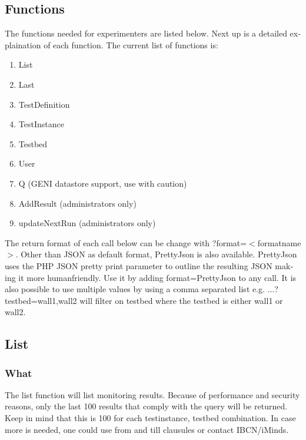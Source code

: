 \begin{otherlanguage}{english}
\section{Functions}
The functions needed for experimenters are listed below. Next up is a detailed explaination of each function. The current list of functions is:
\begin{enumerate}
\item List
\item Last
\item TestDefinition
\item TestInstance
\item Testbed
\item User
\item Q (GENI datastore support, use with caution)
\item AddResult (administrators only)
\item updateNextRun (administrators only)
\end{enumerate}
\npar
The return format of each call below can be change with ?format=$<$formatname$>$. 
Other than JSON as default format, PrettyJson is also available. PrettyJson uses the PHP JSON pretty print parameter to outline the resulting JSON making it more humanfriendly.
Use it by adding format=PrettyJson to any call.
\npar
It is also possible to use multiple values by using a comma separated list e.g. ...?testbed=wall1,wall2 will filter on testbed where the testbed is either wall1 or wall2.
\subsection{List}
\subsubsection{What}
The list function will list monitoring results. Because of performance and security reasons, only the last 100 results that comply with the query will be returned. Keep in mind that this is 100 for each testinstance, testbed combination. In case more is needed, one could use from and till clausules or contact IBCN/iMinds.

\clearpage


\end{otherlanguage}
